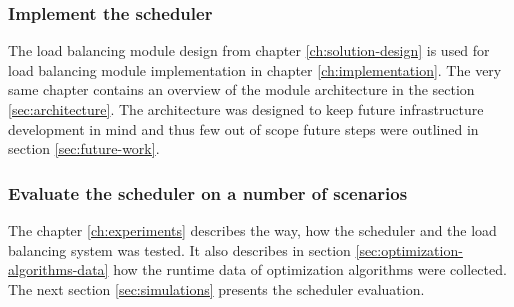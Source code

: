 \subsubsection{Implement the scheduler}
The load balancing module design from chapter \ref{ch:solution-design} is used for 
load balancing module implementation in chapter \ref{ch:implementation}.
The very same chapter contains an overview of the module architecture in the section \ref{sec:architecture}.
The architecture was designed to keep future infrastructure development in mind 
and thus few out of scope future steps were outlined in section \ref{sec:future-work}.

\subsubsection{Evaluate the scheduler on a number of scenarios}
The chapter \ref{ch:experiments} describes the way,
how the scheduler and the load balancing system was tested.
It also describes in section \ref{sec:optimization-algorithms-data} how the runtime data of optimization algorithms were collected.
The next section \ref{sec:simulations} presents the scheduler evaluation.